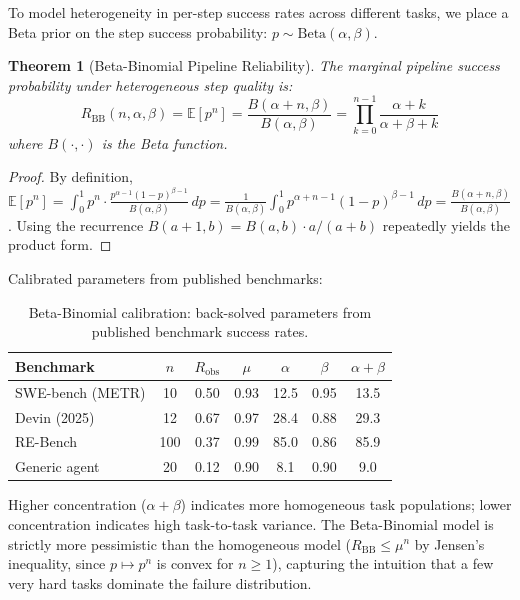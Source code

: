 \documentclass[11pt, a4paper]{googledeepmind}
\newcommand{\E}{\mathbb{E}}
\newtheorem{theorem}{Theorem}[section]
\begin{document}
\begin{appendices}
To model heterogeneity in per-step success rates across different tasks,
we place a Beta prior on the step success probability:
$p \sim \mathrm{Beta}(\alpha, \beta)$.

\begin{theorem}[Beta-Binomial Pipeline Reliability]
The marginal pipeline success probability under heterogeneous step quality is:
\[
  R_{\mathrm{BB}}(n, \alpha, \beta)
    = \E[p^n]
    = \frac{B(\alpha + n, \beta)}{B(\alpha, \beta)}
    = \prod_{k=0}^{n-1} \frac{\alpha + k}{\alpha + \beta + k}
\]
where $B(\cdot, \cdot)$ is the Beta function.
\end{theorem}

\begin{proof}
By definition, $\E[p^n] = \int_0^1 p^n \cdot \frac{p^{\alpha-1}(1-p)^{\beta-1}}{B(\alpha,\beta)} \, dp
= \frac{1}{B(\alpha,\beta)} \int_0^1 p^{\alpha+n-1}(1-p)^{\beta-1} \, dp
= \frac{B(\alpha+n, \beta)}{B(\alpha,\beta)}$.
Using the recurrence $B(a+1,b) = B(a,b) \cdot a/(a+b)$ repeatedly yields
the product form.
\end{proof}

Calibrated parameters from published benchmarks:

\begin{table}[htbp]
\centering
\caption{Beta-Binomial calibration: back-solved parameters from published benchmark success rates.}
\label{tab:ext-betabinom}
\small
\begin{tabular}{lcccccc}
\toprule
\textbf{Benchmark} & $n$ & $R_{\mathrm{obs}}$ & $\mu$ & $\alpha$ & $\beta$ & $\alpha{+}\beta$ \\
\midrule
SWE-bench (METR) & 10 & 0.50 & 0.93 & 12.5 & 0.95 & 13.5 \\
Devin (2025) & 12 & 0.67 & 0.97 & 28.4 & 0.88 & 29.3 \\
RE-Bench & 100 & 0.37 & 0.99 & 85.0 & 0.86 & 85.9 \\
Generic agent & 20 & 0.12 & 0.90 & 8.1 & 0.90 & 9.0 \\
\bottomrule
\end{tabular}
\end{table}

Higher concentration ($\alpha + \beta$) indicates more homogeneous task
populations; lower concentration indicates high task-to-task variance.
The Beta-Binomial model is strictly more pessimistic than the homogeneous model
($R_{\mathrm{BB}} \leq \mu^n$ by Jensen's inequality, since $p \mapsto p^n$
is convex for $n \geq 1$), capturing the intuition that a few very hard tasks
dominate the failure distribution.


\end{appendices}
\end{document}
